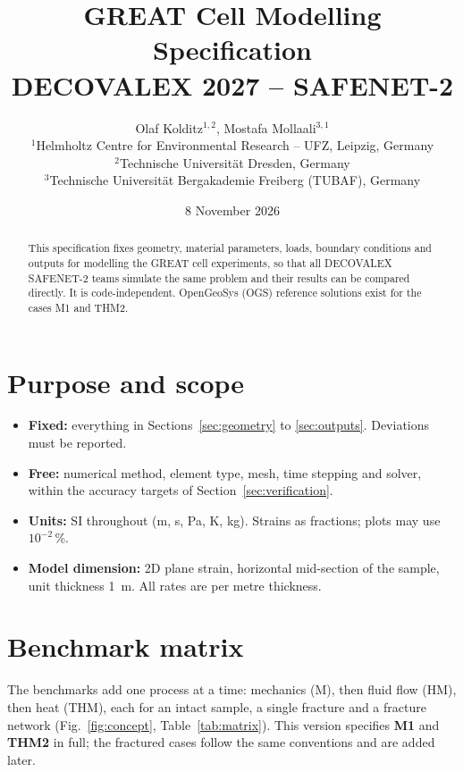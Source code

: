 \documentclass[11pt,a4paper]{article}
\title{GREAT Cell Modelling Specification\\[0.5ex]
\large DECOVALEX 2027 -- SAFENET-2}
\author{Olaf Kolditz$^{1,2}$, Mostafa Mollaali$^{3,1}$\\[2ex]
\small $^{1}$Helmholtz Centre for Environmental Research -- UFZ, Leipzig, Germany\\
\small $^{2}$Technische Universit\"at Dresden, Germany\\
\small $^{3}$Technische Universit\"at Bergakademie Freiberg (TUBAF), Germany}
\date{8 November 2026}
\begin{document}
\maketitle

\begin{abstract}
This specification fixes geometry, material parameters, loads, boundary
conditions and outputs for modelling the GREAT cell experiments, so that all
DECOVALEX SAFENET-2 teams simulate the same problem and their results can be
compared directly. It is code-independent. OpenGeoSys (OGS) reference solutions
exist for the cases M1 and THM2.
\end{abstract}

\tableofcontents

\section{Purpose and scope}
\begin{itemize}
  \item \textbf{Fixed:} everything in Sections~\ref{sec:geometry} to
        \ref{sec:outputs}. Deviations must be reported.
  \item \textbf{Free:} numerical method, element type, mesh, time stepping and
        solver, within the accuracy targets of Section~\ref{sec:verification}.
  \item \textbf{Units:} SI throughout (m, s, Pa, K, kg). Strains as fractions;
        plots may use $10^{-2}$\,\%.
  \item \textbf{Model dimension:} 2D plane strain, horizontal mid-section of
        the sample, unit thickness \SI{1}{m}. All rates are per metre thickness.
\end{itemize}

\section{Benchmark matrix}
The benchmarks add one process at a time: mechanics (M), then fluid flow (HM),
then heat (THM), each for an intact sample, a single fracture and a fracture
network (Fig.~\ref{fig:concept}, Table~\ref{tab:matrix}). This version
specifies \textbf{M1} and \textbf{THM2} in full; the fractured cases follow the
same conventions and are added later.
\end{document}
